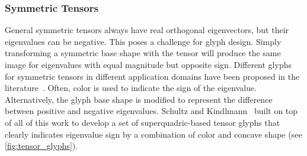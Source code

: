 \subsubsection{Symmetric Tensors} %
%
General symmetric tensors always have real orthogonal eigenvectors, but their
eigenvalues can be negative.
%
This poses a challenge for glyph design.
%
Simply transforming a symmetric base shape with the tensor will produce the same
image for eigenvalues with equal magnitude but opposite sign.
%
Different glyphs for symmetric tensors in different application domains have
been proposed in the literature~\cite{Pajevic1999,Hashash2003,Jeremic2002}.
%
Often, color is used to indicate the sign of the eigenvalue.
%
Alternatively, the glyph base shape is modified to represent the difference
between positive and negative eigenvalues.
%
Schultz and Kindlmann~\cite{Schultz2010a} built on top of all of this work to
develop a set of superquadric-based tensor glyphs that clearly indicates
eigenvalue sign by a combination of color and concave shape (see
\autoref{fig:tensor_glyphs}).
%
%
%
